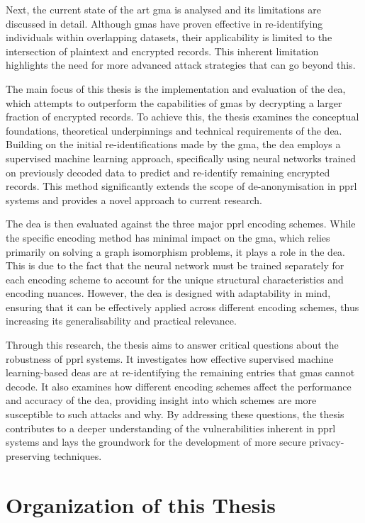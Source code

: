 Next, the current state of the art \ac{gma} is analysed and its limitations are discussed in detail. 
Although \ac{gma}s have proven effective in re-identifying individuals within overlapping datasets, their applicability is limited to the intersection of plaintext and encrypted records. 
This inherent limitation highlights the need for more advanced attack strategies that can go beyond this.

The main focus of this thesis is the implementation and evaluation of the \ac{dea}, which attempts to outperform the capabilities of \ac{gma}s by decrypting a larger fraction of encrypted records. 
To achieve this, the thesis examines the conceptual foundations, theoretical underpinnings and technical requirements of the \ac{dea}. 
Building on the initial re-identifications made by the \ac{gma}, the \ac{dea} employs a supervised machine learning approach, specifically using neural networks trained on previously decoded data to predict and re-identify remaining encrypted records. 
This method significantly extends the scope of de-anonymisation in \ac{pprl} systems and provides a novel approach to current research.

The \ac{dea} is then evaluated against the three major \ac{pprl} encoding schemes. 
While the specific encoding method has minimal impact on the \ac{gma}, which relies primarily on solving a graph isomorphism problems, it plays a role in the \ac{dea}. 
This is due to the fact that the neural network must be trained separately for each encoding scheme to account for the unique structural characteristics and encoding nuances. 
However, the \ac{dea} is designed with adaptability in mind, ensuring that it can be effectively applied across different encoding schemes, thus increasing its generalisability and practical relevance.

Through this research, the thesis aims to answer critical questions about the robustness of \ac{pprl} systems. 
It investigates how effective supervised machine learning-based \ac{dea}s are at re-identifying the remaining entries that \ac{gma}s cannot decode.
It also examines how different encoding schemes affect the performance and accuracy of the \ac{dea}, providing insight into which schemes are more susceptible to such attacks and why. 
By addressing these questions, the thesis contributes to a deeper understanding of the vulnerabilities inherent in \ac{pprl} systems and lays the groundwork for the development of more secure privacy-preserving techniques.

\section{Organization of this Thesis}  \label{sec:orga}

